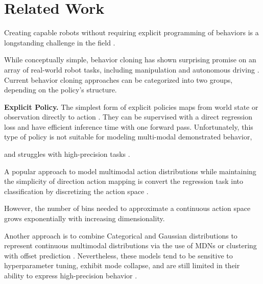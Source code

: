 
\section{Related Work}
Creating capable robots without requiring explicit programming of behaviors is a longstanding challenge in the field \cite{atkeson1997robot, argall2009survey, ravichandar2020recent}.

While conceptually simple, behavior cloning has shown surprising promise on an array of real-world robot tasks, including manipulation \cite{zhang2018deep, florence2019self, mandlekar2020learning, mandlekar2020iris, zeng2021transporter, rahmatizadeh2018vision, avigal2022speedfolding} and autonomous driving \cite{pomerleau1988alvinn, bojarski2016end}. Current behavior cloning approaches can be categorized into two groups, depending on the policy's structure.





\textbf{Explicit Policy.}
The simplest form of explicit policies maps from world state or observation directly to action \cite{pomerleau1988alvinn, zhang2018deep, florence2019self, ross2011reduction, toyer2020magical, rahmatizadeh2018vision, bojarski2016end}. They can be supervised with a direct regression loss and have efficient inference time with one forward pass. Unfortunately, this type of policy is not suitable for modeling multi-modal demonstrated behavior, 

and struggles with high-precision tasks \cite{ibc}.





A popular approach to model multimodal action distributions while maintaining the simplicity of direction action mapping is convert the regression task into classification by discretizing the action space \cite{zeng2021transporter, wu2020spatial, avigal2022speedfolding}. 

However, the number of bins needed to approximate a continuous action space grows exponentially with increasing dimensionality. 

Another approach is to combine Categorical and Gaussian distributions to represent continuous multimodal distributions via the use of MDNs \cite{bishop1994mixture, robomimic} or clustering with offset prediction \cite{bet, sharma2018multiple}. Nevertheless, these models tend to be sensitive to hyperparameter tuning, exhibit mode collapse, and are still limited in their ability to express high-precision behavior \cite{ibc}.







